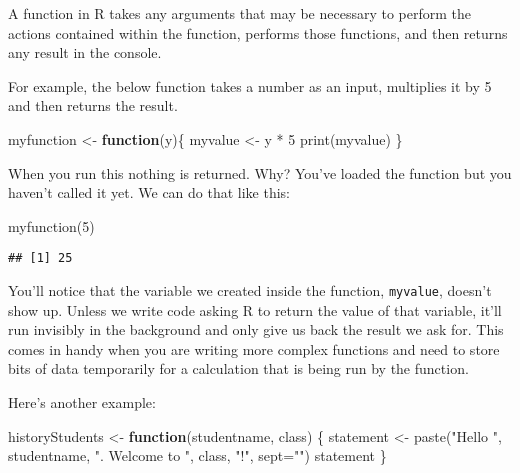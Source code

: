 \documentclass[
]{article}
\newenvironment{Shaded}{\begin{snugshade}}{\end{snugshade}}
\newcommand{\AttributeTok}[1]{\textcolor[rgb]{0.77,0.63,0.00}{#1}}
\newcommand{\ControlFlowTok}[1]{\textcolor[rgb]{0.13,0.29,0.53}{\textbf{#1}}}
\newcommand{\DecValTok}[1]{\textcolor[rgb]{0.00,0.00,0.81}{#1}}
\newcommand{\FunctionTok}[1]{\textcolor[rgb]{0.00,0.00,0.00}{#1}}
\newcommand{\NormalTok}[1]{#1}
\newcommand{\OtherTok}[1]{\textcolor[rgb]{0.56,0.35,0.01}{#1}}
\newcommand{\SpecialCharTok}[1]{\textcolor[rgb]{0.00,0.00,0.00}{#1}}
\newcommand{\StringTok}[1]{\textcolor[rgb]{0.31,0.60,0.02}{#1}}
\begin{document}
A function in R takes any arguments that may be necessary to perform the
actions contained within the function, performs those functions, and
then returns any result in the console.

For example, the below function takes a number as an input, multiplies
it by 5 and then returns the result.

\begin{Shaded}
\begin{Highlighting}[]
\NormalTok{myfunction }\OtherTok{\textless{}{-}} \ControlFlowTok{function}\NormalTok{(y)\{}
\NormalTok{  myvalue }\OtherTok{\textless{}{-}}\NormalTok{ y }\SpecialCharTok{*} \DecValTok{5}
  \FunctionTok{print}\NormalTok{(myvalue)}
\NormalTok{\}}
\end{Highlighting}
\end{Shaded}

When you run this nothing is returned. Why? You've loaded the function
but you haven't called it yet. We can do that like this:

\begin{Shaded}
\begin{Highlighting}[]
\FunctionTok{myfunction}\NormalTok{(}\DecValTok{5}\NormalTok{)}
\end{Highlighting}
\end{Shaded}

\begin{verbatim}
## [1] 25
\end{verbatim}

You'll notice that the variable we created inside the function,
\texttt{myvalue}, doesn't show up. Unless we write code asking R to
return the value of that variable, it'll run invisibly in the background
and only give us back the result we ask for. This comes in handy when
you are writing more complex functions and need to store bits of data
temporarily for a calculation that is being run by the function.

Here's another example:

\begin{Shaded}
\begin{Highlighting}[]
\NormalTok{historyStudents }\OtherTok{\textless{}{-}} \ControlFlowTok{function}\NormalTok{(studentname, class) \{}
\NormalTok{  statement }\OtherTok{\textless{}{-}} \FunctionTok{paste}\NormalTok{(}\StringTok{"Hello "}\NormalTok{, studentname, }\StringTok{". Welcome to "}\NormalTok{, class, }\StringTok{"!"}\NormalTok{, }\AttributeTok{sept=}\StringTok{""}\NormalTok{)}
\NormalTok{  statement}
\NormalTok{\}}
\end{Highlighting}
\end{Shaded}
\end{document}

